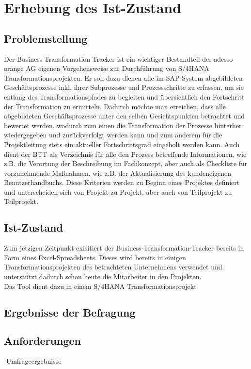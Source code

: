 \section{Erhebung des Ist-Zustand}

\subsection{Problemstellung}
Der Business-Transformation-Tracker ist ein wichtiger Bestandteil der adesso orange AG eigenen Vorgehensweise zur Durchführung von S/4HANA Transformationsprojekten. Er soll dazu dienen alle im SAP-System abgebildeten Geschäftsprozesse inkl. ihrer Subprozesse und Prozessschritte zu erfassen, um sie entlang des Transformationspfades zu begleiten und übersichtlich den Fortschritt der Transformation zu ermitteln. Dadurch möchte man erreichen, dass alle abgebildeten Geschäftsprozesse unter den selben Gesichtspunkten betrachtet und bewertet werden, wodurch zum einen die Transformation der Prozesse hinterher wiedergegeben und zurückverfolgt werden kann und zum anderem für die Projektleitung stets ein aktueller Fortschrittsgrad eingeholt werden kann. Auch dient der BTT als Verzeichnis für alle den Prozess betreffende Informationen, wie z.B. die Verortung der Beschreibung im Fachkonzept, aber auch als Checkliste für vorzunehmende Maßnahmen, wie z.B. der Aktualisierung des kundeneigenen Benutzerhandbuchs. Diese Kriterien werden zu Beginn eines Projektes definiert und unterscheiden sich von Projekt zu Projekt, aber auch von Teilprojekt zu Teilprojekt.  


\subsection{Ist-Zustand}
Zum jetzigen Zeitpunkt exisitiert der Business-Transformation-Tracker bereits in Form eines Excel-Spreadsheets. Dieses wird bereits in einigen Transformationsprojekten des betrachteten Unternehmens verwendet und unterstützt dadurch schon heute die Mitarbeiter in den Projekten. \\Das Tool dient dazu in einem S/4HANA Transformationsprojekt 

\subsection{Ergebnisse der Befragung}

\subsection{Anforderungen}
-Umfrageergebnisse

